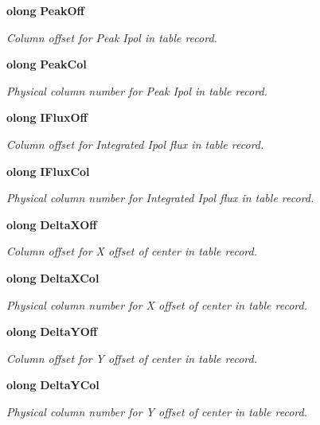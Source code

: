 \begin{CompactItemize}
{\bf olong} {\bf Peak\-Off}
\begin{CompactList}\small\item\em Column offset for Peak Ipol in table record. \item\end{CompactList}\item 
{\bf olong} {\bf Peak\-Col}
\begin{CompactList}\small\item\em Physical column number for Peak Ipol in table record. \item\end{CompactList}\item 
{\bf olong} {\bf IFlux\-Off}
\begin{CompactList}\small\item\em Column offset for Integrated Ipol flux in table record. \item\end{CompactList}\item 
{\bf olong} {\bf IFlux\-Col}
\begin{CompactList}\small\item\em Physical column number for Integrated Ipol flux in table record. \item\end{CompactList}\item 
{\bf olong} {\bf Delta\-XOff}
\begin{CompactList}\small\item\em Column offset for X offset of center in table record. \item\end{CompactList}\item 
{\bf olong} {\bf Delta\-XCol}
\begin{CompactList}\small\item\em Physical column number for X offset of center in table record. \item\end{CompactList}\item 
{\bf olong} {\bf Delta\-YOff}
\begin{CompactList}\small\item\em Column offset for Y offset of center in table record. \item\end{CompactList}\item 
{\bf olong} {\bf Delta\-YCol}
\begin{CompactList}\small\item\em Physical column number for Y offset of center in table record. \item\end{CompactList}\item 

\end{CompactItemize}
